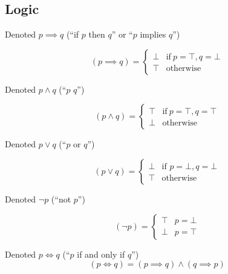 \subsection{Logic}
\begin{definition*}\label{def:conditional-operator}
    
    Denoted $p \implies q$ (``if $p$ then $q$'' or ``$p$ implies $q$'')

    \[
    (p \implies q)=\begin{cases} \bot & \text{if}\ p=\top,q=\bot \\ \top & \text{otherwise} \end{cases}
    \]
\end{definition*}
\begin{definition*}\label{def:conjunction-operator}
    Denoted $p \land q$ (``$p$  $q$'')

    \[
    (p \land q)=\begin{cases} \top & \text{if}\ p=\top,q=\top \\ \bot & \text{otherwise} \end{cases}
    \]
\end{definition*}
\begin{definition*}\label{def:disjunction-operator}
    Denoted $p \lor q$ (``$p \text{ or } q$'')

    \[
    (p \lor q) = \begin{cases} \bot & \text{if } p=\bot, q=\bot \\ \top & \text{otherwise} \end{cases}
    \]
\end{definition*}
\begin{definition*}\label{def:negation-operator}
    Denoted $\neg p$ (``not $p$'')

    \[
    (\neg p) = \begin{cases} \top & p=\bot \\ \bot & p=\top \end{cases}
    \]
    
\end{definition*}

\begin{definition*}\label{def:biconditional-operator}
    Denoted $p\iff q$ (``$p$ if and only if $q$'')
    \[
    (p\iff q)=(p \implies q) \land (q \implies p)
    \]
    
\end{definition*}


